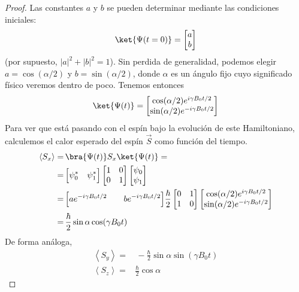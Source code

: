 \documentclass[a4paper,11pt]{book} %
\numberwithin{equation}{chapter}
\def\Lc{\Bigl[}
\def\Rc{\Bigr]}
\begin{document}
\begin{proof}
Las constantes $a$ y $b$ se pueden determinar mediante las condiciones iniciales:
	\begin{equation}
	\ket{\Psi (t = 0)} = \begin{bmatrix} a \\ b	\end{bmatrix}
	\end{equation}
(por supuesto, $|a|^2 + |b|^2 = 1$). Sin perdida de generalidad, podemos elegir $a = \cos (\alpha/2)$ y $b = \sin (\alpha/2)$, donde $\alpha$ es un ángulo fijo cuyo significado físico veremos dentro de poco.
Tenemos entonces
	\begin{equation}
	\ket{\Psi (t)} = 
	\begin{bmatrix} 
	\cos (\alpha/2) e^{i \gamma B_0 t/2} \\ 
	\sin (\alpha/2) e^{-i \gamma B_0 t/2} 
	\end{bmatrix}
	\end{equation}
Para ver que está pasando con el espín bajo la evolución de este Hamiltoniano, calculemos el calor esperado del espín $\vec{S}$ como función del tiempo.
	\begin{equation} 
\begin{aligned}
	\left\langle S_x \right\rangle = & \, \bra{\Psi(t)} S_x \ket{\Psi(t)} = 
	\nonumber \\
	= & \, \Lc \psi_0^* \quad \psi_1^* \Rc 
	\begin{bmatrix} 1 & 0 \\ 0 & 1 \end{bmatrix}  
	\begin{bmatrix} \psi_0 \\ \psi_1 \end{bmatrix} 
	\nonumber \\
	= & \, \Lc a e ^{-i \gamma B_0 t/2} \qquad  b e ^{-i \gamma B_0 t/2} \Rc 
	\frac{\hbar}{2} \begin{bmatrix} 0 & 1 \\ 1 & 0 \end{bmatrix} 
	\begin{bmatrix} \cos (\alpha/2) e^{i \gamma B_0 t/2} \\ \sin (\alpha/2) e^{-i \gamma B_0 t/2} \end{bmatrix} 
	\nonumber \\
	= & \, \frac{\hbar}{2} \sin \alpha \cos (\gamma B_0 t ) 
	\end{aligned}
\end{equation}
De forma análoga,
	\begin{equation} 
\begin{aligned}
	\left\langle S_y \right\rangle = & \, - \frac{\hbar}{2} \sin \alpha \sin (\gamma B_0 t )  \\
	\left\langle S_z \right\rangle = & \frac{\hbar}{2} \cos \alpha
	\end{aligned}
\end{equation}


\end{proof}
\end{document}
